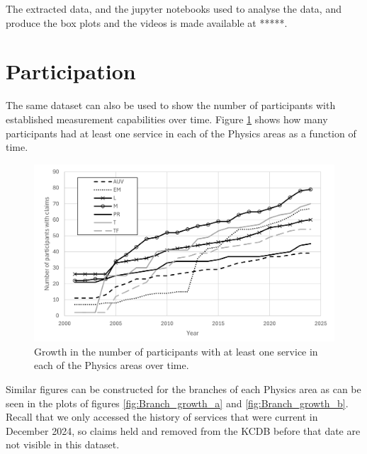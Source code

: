 \documentclass[
	a4paper, %
	10pt, %
	unnumberedsections, %
	twoside, %
]{LTJournalArticle}
\begin{document}
The extracted data, and the jupyter notebooks used to analyse the data, and produce the box plots and the videos is made available at *****.

\section{Participation}

The same dataset can also be used to show the number of participants with established measurement capabilities over time. Figure \ref{fig:Physics_growth} shows how many participants had at least one service in each of the Physics areas as a function of time.

\begin{figure}[!htpb]
    \centering
    \includegraphics[width=\linewidth]{figures/Participants_Physics.png}
    \caption{Growth in the number of participants with at least one service in each of the Physics areas over time.}
    \label{fig:Physics_growth}
\end{figure}

Similar figures can be constructed for the branches of each Physics area as can be seen in the plots of figures \ref{fig:Branch_growth_a} and \ref{fig:Branch_growth_b}. Recall that we only accessed the history of services that were current in December 2024, so claims held and removed from the KCDB before that date are not visible in this dataset.
\end{document}
